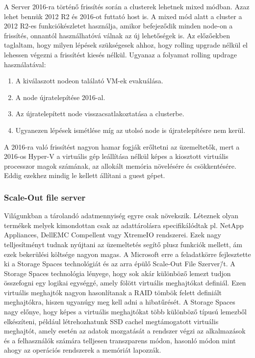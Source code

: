 \documentclass[12pt,oneside,justify]{book}
\begin{document}
A Server 2016-ra történő frissítés során a clusterek lehetnek mixed módban. Azaz lehet bennük 2012 R2 és 2016-ot futtató host is. A mixed mód alatt a cluster a 2012 R2-es funkciókészletet használja, amikor befejeződik minden node-on a frissítés, onnantól használhatóvá válnak az új lehetőségek is. Az előzőekben taglaltam, hogy milyen lépések szükségesek ahhoz, hogy rolling upgrade nélkül el lehessen végezni a frissítést kiesés nélkül. 
Ugyanaz a folyamat rolling updrage használatával:
\begin{enumerate}
	\item A kiválaszott nodeon találató VM-ek evakuálása.
	\item A node újratelepítése 2016-al.
	\item Az újratelepített node visszacsatlakoztatása a clusterbe. 
	\item Ugyanezen lépések ismétlése míg az utolsó node is újratelepítésre nem kerül.
\end{enumerate}

A 2016-ra való frissítést nagyon hamar fogják erőltetni az üzemeltetők, mert a 2016-os Hyper-V a virtuális gép leállítása nélkül képes a kiosztott virtuális processzor magok számának, az allokált memória növelésére és csökkentésére. Eddig ezekhez mindig le kellett állítani a guest gépet. 

\subsubsection{Scale-Out file server}

Világunkban a tárolandó adatmennyiség egyre csak növekszik. Léteznek olyan termékek melyek kimondottan csak az adattárolásra specifikálódtak pl. NetApp Appliances, DellEMC Compellent vagy XtremeIO rendszerei. Ezek nagy telljesítményt tudnak nyújtani az üzemeltetés segítő plusz funkciók mellett, ám ezek bekerülési költsége nagyon magas.
A Microsoft erre a feladatkörre fejlesztette ki a Storage Spaces technológiát és az arra épülő Scale-Out File Szerver\=/t.
\newline
A Storage Spaces technológia lényege, hogy sok akár különböző lemezt tudjon összefogni egy logikai egységgé, amely fölött virtuális meghajtókat definiál. Ezen virtuális meghajtók nagyon hasonlítanak a RAID tömbök felett definiált meghajtókra, hiszen ugyanúgy meg kell adni a hibatűrését.  A Storage Spaces nagy előnye, hogy képes a virtuális meghajtókat több különböző típusú lemezből elkészíteni, például létrehozhatunk SSD cachel megtámogatott virtuális meghajtót, amely esetén az adatok mozgatását a rendszer végzi az alkalmazások és a felhasználók számára telljesen transzparens módon, hasonló módon mint ahogy az operációs rendszerek a memóriát lapozzák.
\end{document}
